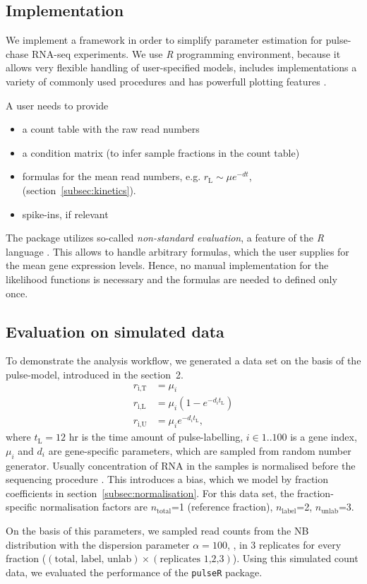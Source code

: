 \subsection{Implementation}
We implement a framework in order  to simplify parameter estimation for 
pulse-chase RNA-seq experiments. 
We use \emph{R} programming environment, 
because it allows very flexible handling of user-specified models, 
includes implementations a variety of commonly used procedures and 
has powerfull plotting features \citep{rlang}.
\par A user needs to provide
\begin{itemize}
 \item a count table with the raw read numbers
 \item a condition matrix (to infer sample fractions in the count table)
 \item formulas for the mean read numbers, e.g. 
 $r_\text{L}\sim \mu e^{-dt}$, (section~\ref{subsec:kinetics}).
 \item spike-ins, if relevant
\end{itemize}
The package utilizes so-called \emph{non-standard evaluation},
a feature of the \emph{R} language \citep{team2000r}.
This allows to handle arbitrary formulas, which the user supplies for 
the mean gene expression levels. Hence, no manual 
implementation for the likelihood functions is necessary and the 
formulas are needed to defined only once.
\subsection{Evaluation on simulated data}
To demonstrate the analysis workflow, we generated a data 
set on the basis of the pulse-model, introduced in the section~2.
\begin{align}
 r_\text{i,T}&=\mu_i\\
 r_\text{i,L}&=\mu_i \left(1-e^{-d_it_\text{L}}\right)\\
 r_\text{i,U}&=\mu_i e^{-d_it_\text{L}},
\end{align}
where $t_\text{L} = 12$ hr is the time amount of pulse-labelling,
$i \in 1..100$ is a gene index, $\mu_i$ and $d_i$ are gene-specific parameters,
which are sampled from random number generator.
Usually concentration of RNA in the samples is normalised before the
sequencing procedure \citep{}. This introduces a bias, which 
we model by fraction coefficients in section~\ref{subsec:normalisation}. 
For this data set,  the fraction-specific normalisation factors are 
$n_\text{total}$=1 ({reference fraction}),
$n_\text{label}$=2,
$n_\text{unlab}$=3.
\par 
On the basis of this parameters,  we sampled read counts from the NB distribution 
with the dispersion parameter $\alpha=100$, \cite{}, in 3 replicates for 
every fraction ($(\text{total, label, unlab})\times(\text{replicates 1,2,3})$).
Using this simulated count data,  we evaluated the performance of the 
\verb|pulseR| package.


